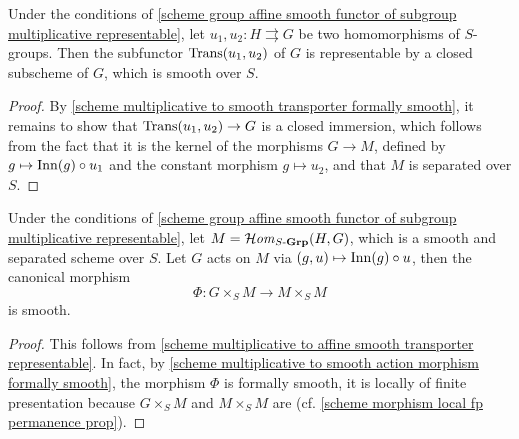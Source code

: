 \begin{corollary}\label{scheme multiplicative to affine smooth transporter representable}
Under the conditions of \cref{scheme group affine smooth functor of subgroup multiplicative representable}, let $u_1,u_2:H\rightrightarrows G$ be two homomorphisms of $S$-groups. Then the subfunctor $\mathrm{Trans}(u_1,u_2)$ of $G$ is representable by a closed subscheme of $G$, which is smooth over $S$.
\end{corollary}
\begin{proof}
By \cref{scheme multiplicative to smooth transporter formally smooth}, it remains to show that $\mathrm{Trans}(u_1,u_2)\to G$ is a closed immersion, which follows from the fact that it is the kernel of the morphisms $G\to M$, defined by $g\mapsto\mathrm{Inn}(g)\circ u_1$ and the constant morphism $g\mapsto u_2$, and that $M$ is separated over $S$.
\end{proof}

\begin{corollary}\label{scheme group multiplicative to affine smooth sHom action smooth}
Under the conditions of \cref{scheme group affine smooth functor of subgroup multiplicative representable}, let $M=\operatorname{\mathcal{H}\hspace*{-0.4pt}\textit{om}\hspace{0.5pt}}_{S\textup{-}\mathbf{Grp}}(H,G)$, which is a smooth and separated scheme over $S$. Let $G$ acts on $M$ via $(g,u)\mapsto\mathrm{Inn}(g)\circ u$, then the canonical morphism
\begin{equation}\label{scheme group multiplicative to affine smooth sHom action smooth-1}
\Phi:G\times_SM\to M\times_SM
\end{equation}
is smooth.
\end{corollary}
\begin{proof}
This follows from \cref{scheme multiplicative to affine smooth transporter representable}. In fact, by \cref{scheme multiplicative to smooth action morphism formally smooth}, the morphism $\Phi$ is formally smooth, it is locally of finite presentation because $G\times_SM$ and $M\times_SM$ are (cf. \cref{scheme morphism local fp permanence prop}).
\end{proof}

